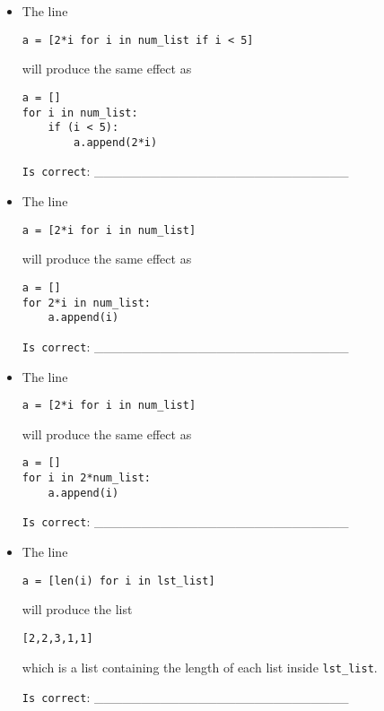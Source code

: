 \documentclass[a4paper,11pt]{scrartcl}
\begin{document}
\begin{itemize}
\singlespacing
\item The line
\begin{verbatim}
a = [2*i for i in num_list if i < 5]
\end{verbatim}
will produce the same effect as
\begin{verbatim}
a = []
for i in num_list:
    if (i < 5):
        a.append(2*i)
\end{verbatim}

\verb|Is correct|: \_\_\_\_\_\_\_\_\_\_\_\_\_\_\_\_\_\_\_\_\_\_\_\_\_\_\_


\item The line
\begin{verbatim}
a = [2*i for i in num_list]
\end{verbatim}
will produce the same effect as
\begin{verbatim}
a = []
for 2*i in num_list:
    a.append(i)
\end{verbatim}

\verb|Is correct|: \_\_\_\_\_\_\_\_\_\_\_\_\_\_\_\_\_\_\_\_\_\_\_\_\_\_\_


\item The line
\begin{verbatim}
a = [2*i for i in num_list]
\end{verbatim}
will produce the same effect as
\begin{verbatim}
a = []
for i in 2*num_list:
    a.append(i)
\end{verbatim}

\verb|Is correct|: \_\_\_\_\_\_\_\_\_\_\_\_\_\_\_\_\_\_\_\_\_\_\_\_\_\_\_


\item The line
\begin{verbatim}
a = [len(i) for i in lst_list]
\end{verbatim}
will produce the list
\begin{verbatim}
[2,2,3,1,1]
\end{verbatim}
which is a list containing the length of each list inside \verb|lst_list|.

\verb|Is correct|: \_\_\_\_\_\_\_\_\_\_\_\_\_\_\_\_\_\_\_\_\_\_\_\_\_\_\_



\end{itemize}
\end{document}
